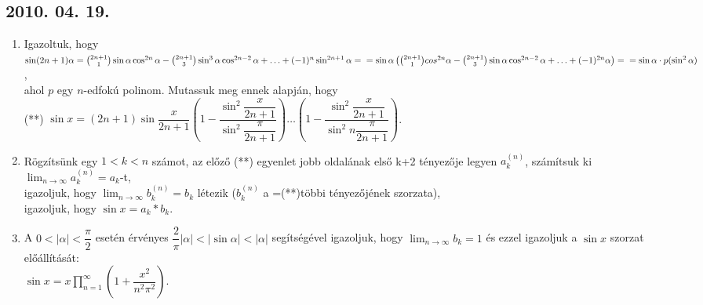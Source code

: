 \documentclass{article}
\begin{document}
\subsection*{2010. 04. 19.}
\begin{enumerate}
\item Igazoltuk, hogy \\
$\sin(2n+1)\alpha=\binom{2n+1}{1}\sin\alpha\cos^{2n}\alpha-\binom{2n+1}{3}\sin^3\alpha\cos^{2n-2}\alpha+\ldots+(-1)^n \sin^{2n+1}\alpha=\\=
\sin\alpha\left(\binom{2n+1}{1}cos^{2n}\alpha-\binom{2n+1}{3}\sin\alpha\cos^{2n-2}\alpha+\ldots+(-1)^{2n}\alpha\right)=\\=
\sin\alpha\cdot p (\sin^2\alpha)$, \\ahol $p$ egy $n$-edfokú polinom. Mutassuk meg ennek alapján, hogy\\ (**)
$\sin x=(2n+1)\sin \dfrac{x}{2n+1}\left(1-\dfrac{\sin^2\dfrac{x}{2n+1}}{\sin^2\dfrac{\pi}{2n+1}}\right)\ldots\left(1-\dfrac{\sin^2\dfrac{x}{2n+1}}{\sin^2 n \dfrac{\pi}{2n+1}}\right)$.
\item Rögzítsünk egy $1<k<n$ számot, az előző (**) egyenlet jobb oldalának első k+2 tényezője legyen $a_k^{(n)}$, számítsuk ki $\displaystyle\lim_{n \to \infty}a_k^{(n)}=a_k$-t,\\ 
igazoljuk, hogy $\displaystyle\lim_{n \to \infty} b_k^{(n)}=b_k$ létezik ($b_k^{(n)}$ a =(**)többi tényezőjének szorzata),\\ igazoljuk, hogy $\sin x =a_k*b_k$.
\item A $0<|\alpha|<\dfrac{\pi}{2}$ esetén érvényes $\dfrac{2}{\pi}|\alpha|<|\sin\alpha|<|\alpha|$ segítségével igazoljuk, hogy $\displaystyle\lim_{n \to \infty}b_k=1$ és ezzel igazoljuk a $\sin x$ szorzat előállítását:\\
$\sin x =x\displaystyle\prod_{n=1}^{\infty}\left(1+\dfrac{x^2}{n^2\pi^2}\right)$.

\end{enumerate}
\end{document}
